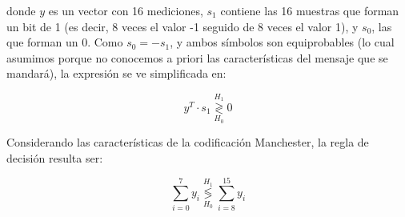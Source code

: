 \documentclass[main.tex]{subfiles}
\begin{document}
 donde $y$ es un vector con 16 mediciones, $s_1$ contiene las 16 muestras que forman un bit de 1 (es decir, 8 veces el valor -1 seguido de 8 veces el valor 1), y $s_0$, las que forman un 0. Como $s_0 = -s_1$, y ambos s\'imbolos son equiprobables (lo cual asumimos porque no conocemos a priori las caracter\'isticas del mensaje que se mandar\'a), la expresi\'on se ve simplificada en:
 
 \begin{equation}
 	y^{T} \cdot s_1 \underset{H_0}{\overset{H_1}{\gtrless}} 0
 \end{equation}
 
Considerando las caracter\'isticas de la codificaci\'on Manchester, la regla de decisi\'on resulta ser:

\begin{equation}
	\sum_{i=0}^7 y_i \underset{H_0}{\overset{H_1}{\lessgtr}}
	\sum_{i=8}^{15} y_i
\end{equation} 
 
\end{document}
